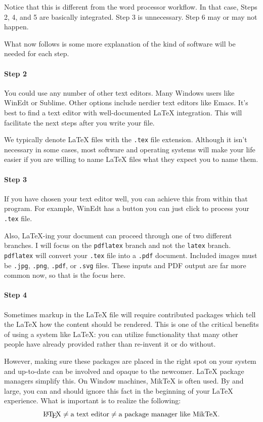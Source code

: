 Notice that this is different from the word processor workflow. In
that case, Steps 2, 4, and 5 are basically integrated. Step 3 is
unnecessary. Step 6 may or may not happen.

What now follows is some more explanation of the kind of software will be needed
for each step.

\paragraph{Step 2} You could use any number of other text editors. Many Windows
users like WinEdt or Sublime. Other options include nerdier text editors like
Emacs. It's best to find a text editor with well-documented \LaTeX{}
integration. This will facilitate the next steps after you write your file.

We typically denote \LaTeX{} files with the \texttt{.tex} file
extension. Although it isn't necessary in some cases, most software and
operating systems will make your life easier if you are willing to name \LaTeX{}
files what they expect you to name them.

\paragraph{Step 3} If you have chosen your text editor well, you can achieve
this from within that program. For example, WinEdt has a button you can just
click to process your \texttt{.tex} file.

\par Also, \LaTeX{}-ing your document can proceed through one of two different
branches. I will focus on the \texttt{pdflatex} branch and not the
\texttt{latex} branch. \texttt{pdflatex} will convert your \texttt{.tex} file
into a \texttt{.pdf} document. Included images must be \texttt{.jpg},
\texttt{.png}, \texttt{.pdf}, or \texttt{.svg} files. These inputs and PDF
output are far more common now, so that is the focus here.

\paragraph{Step 4} Sometimes markup in the \LaTeX{} file will require
contributed packages which tell the \LaTeX{} how the content should be
rendered. This is one of the critical benefits of using a system like \LaTeX{}:
you can utilize functionality that many other people have already provided
rather than re-invent it or do without.

However, making sure these packages are placed in the right spot on your system
and up-to-date can be involved and opaque to the newcomer. \LaTeX{} package
managers simplify this. On Window machines, MikTeX is often used. By and large,
you can and should ignore this fact in the beginning of your \LaTeX{}
experience. What is important is to realize the following:
\[
\textrm{\LaTeX{}} \neq \textrm{a text editor} \neq \textrm{a package manager
  like MikTeX}.
\]


